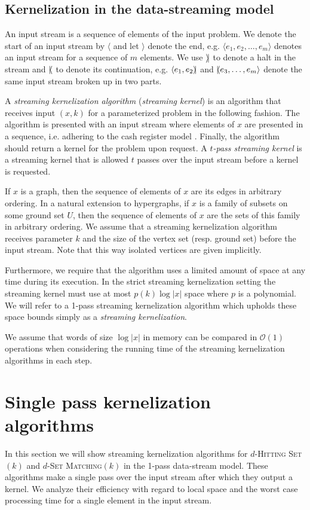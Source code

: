 \documentclass[draft,a4paper]{llncs}
\newcommand{\Oh}{\mathcal{O}}
\newcommand{\halt}{\mathbin{\rangle\mkern-4mu|}}
\newcommand{\resume}{\mathbin{|\mkern-4mu\langle}}
\begin{document}
\subsection*{Kernelization in the data-streaming model}

An input stream is a sequence of elements of the input problem. 
We denote the start of an input stream by $\langle$ and let $\rangle$ denote the end, 
e.g. $\langle e_1, e_2, \ldots, e_m \rangle$ denotes an input stream for a sequence of $m$ elements. 
We use $\halt$ to denote a halt in the stream and $\resume$ to denote its continuation, 
e.g. $\langle e_1, e_2 \halt$ and $\resume e_3, \ldots, e_m \rangle$ denote the same input stream broken up in two parts.

A \emph{streaming kernelization algorithm} (\emph{streaming kernel}) is an algorithm that receives input $(x, k)$ for a
parameterized problem in the following fashion. The algorithm is presented with an input stream where elements of $x$ are presented in a sequence,
i.e. adhering to the cash register model \cite{muthukrishnan2005data}. 
Finally, the algorithm should return a kernel for the problem upon request. A \emph{$t$-pass streaming kernel} is a streaming kernel that is allowed $t$ passes over the input stream before a kernel is requested. 

If $x$ is a graph, then the sequence of elements of $x$ are its edges in arbitrary ordering. In a natural extension to hypergraphs, if $x$ is a family of subsets on some ground set $U$, then the sequence of elements of $x$ are the sets of this family in arbitrary ordering. We assume that a streaming kernelization algorithm receives parameter $k$ and the size of the vertex set (resp. ground set) before the input stream. Note that this way isolated vertices are given implicitly.

Furthermore, we require that the algorithm uses a limited amount of space at any time during its execution. In the strict streaming kernelization setting the streaming kernel must use at most $p(k)\log |x|$ space where $p$ is a polynomial.
We will refer to a 1-pass streaming kernelization algorithm which upholds these space bounds simply as a \emph{streaming kernelization}.

We assume that words of size $\log |x|$ in memory can be compared in $\Oh(1)$ operations when considering the running time of the streaming kernelization algorithms in each step.

\section{Single pass kernelization algorithms}\label{sec:singlepass}
In this section we will show streaming kernelization algorithms for $d$-\textsc{Hitting Set}$(k)$ 
and $d$-\textsc{Set Matching}$(k)$ in the 1-pass data-stream model. 
These algorithms make a single pass over the input stream after which they output a kernel.
We analyze their efficiency with regard to local space and the worst case processing time for a 
single element in the input stream.
\end{document}
